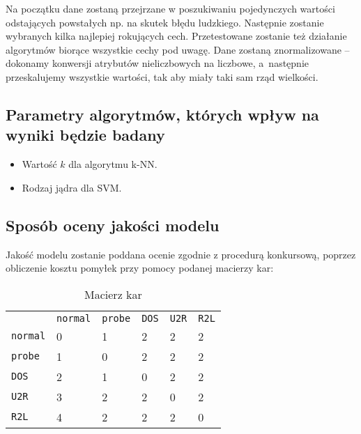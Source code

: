 \documentclass[a4paper, 12pt]{article}
\begin{document}
Na początku dane zostaną przejrzane w poszukiwaniu pojedynczych wartości odstających
powstałych np. na skutek błędu ludzkiego. Następnie zostanie wybranych kilka najlepiej rokujących
cech. Przetestowane zostanie też działanie algorytmów biorące wszystkie cechy pod uwagę.
Dane zostaną znormalizowane -- dokonamy konwersji atrybutów nieliczbowych na liczbowe,
a~następnie przeskalujemy wszystkie wartości, tak aby miały taki sam rząd wielkości.

\subsection{Parametry algorytmów, których wpływ na wyniki będzie badany}

\begin{itemize}
 \item Wartość $k$ dla algorytmu k-NN.
 \item Rodzaj jądra dla SVM.
\end{itemize}

\subsection{Sposób oceny jakości modelu}
Jakość modelu zostanie poddana ocenie zgodnie z procedurą konkursową,
poprzez obliczenie kosztu pomyłek przy pomocy podanej macierzy kar:

\begin{table}[H]
\centering
\begin{tabular}{ l l l l l l }
       & \texttt{normal}&\texttt{probe}	&\texttt{DOS}	&\texttt{U2R}	&\texttt{R2L} \\
\texttt{normal}	&0	&1	&2	&2	&2 \\
\texttt{probe}	&1	&0	&2	&2	&2 \\
\texttt{DOS}	&2	&1	&0	&2	&2 \\
\texttt{U2R}	&3	&2	&2	&0	&2 \\
\texttt{R2L}	&4	&2	&2	&2	&0 \\
\end{tabular}
\caption{Macierz kar}
\label{table:cov_matrix}
\end{table}

\end{document}
